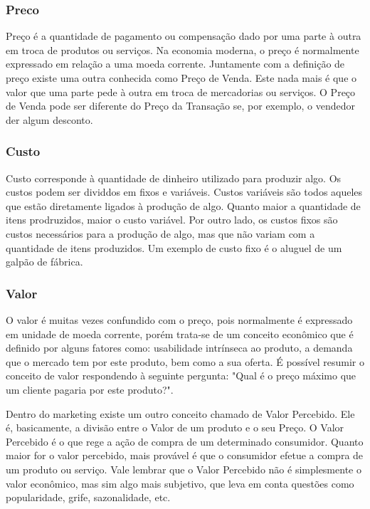 \documentclass[12pt]{article}
\begin{document}
\subsubsection{Preco}
Preço é a quantidade de pagamento ou compensação dado por uma parte à outra em troca de produtos ou serviços. Na economia moderna, o preço é normalmente expressado em relação a uma moeda corrente. Juntamente com a definição de preço existe uma outra conhecida como Preço de Venda. Este nada mais é que o valor que uma parte pede à outra em troca de mercadorias ou serviços. O Preço de Venda pode ser diferente do Preço da Transação se, por exemplo, o vendedor der algum desconto.

\subsubsection{Custo}
Custo corresponde à quantidade de dinheiro utilizado para produzir algo. Os custos podem ser dividdos em fixos e variáveis. Custos variáveis são todos aqueles que estão diretamente ligados à produção de algo. Quanto maior a quantidade de itens prodruzidos, maior o custo variável. Por outro lado, os custos fixos são custos necessários para a produção de algo, mas que não variam com a quantidade de itens produzidos. Um exemplo de custo fixo é o aluguel de um galpão de fábrica.

\subsubsection{Valor}
O valor é muitas vezes confundido com o preço, pois normalmente é expressado em unidade de moeda corrente, porém trata-se de um conceito econômico que é definido por alguns fatores como: usabilidade intrínseca ao produto, a demanda que o mercado tem por este produto, bem como a sua oferta. É possível resumir o conceito de valor respondendo à seguinte pergunta: "Qual é o preço máximo que um cliente pagaria por este produto?".

Dentro do marketing existe um outro conceito chamado de Valor Percebido. Ele é, basicamente, a divisão entre o Valor de um produto e o seu Preço. O Valor Percebido é o que rege a ação de compra de um determinado consumidor. Quanto maior for o valor percebido, mais provável é que o consumidor efetue a compra de um produto ou serviço. Vale lembrar que o Valor Percebido não é simplesmente o valor econômico, mas sim algo mais subjetivo, que leva em conta questões como popularidade, grife, sazonalidade, etc.
\end{document}

